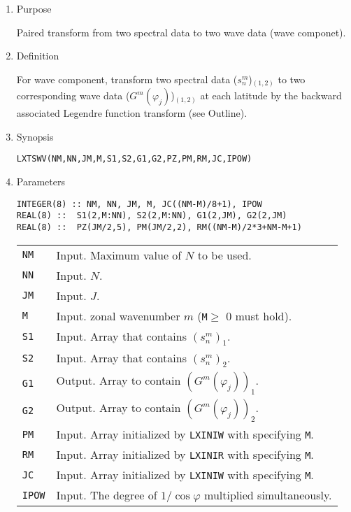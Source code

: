 \documentclass[a4paper]{scrartcl}
\begin{document}
\begin{enumerate}

\item Purpose

Paired transform from two spectral data to two wave data (wave componet).

\item Definition

For wave component, transform two spectral data ($s^m_n$)$_{(1,2)}$
to two corresponding wave data ($G^m(\varphi_j)$)$_{(1,2)}$ at each latitude
by the backward associated Legendre function transform (see Outline).

\item Synopsis 

\texttt{LXTSWV(NM,NN,JM,M,S1,S2,G1,G2,PZ,PM,RM,JC,IPOW)}
  
\item Parameters

\begin{verbatim}  
INTEGER(8) :: NM, NN, JM, M, JC((NM-M)/8+1), IPOW
REAL(8) ::  S1(2,M:NN), S2(2,M:NN), G1(2,JM), G2(2,JM)
REAL(8) ::  PZ(JM/2,5), PM(JM/2,2), RM((NM-M)/2*3+NM-M+1)
\end{verbatim}  

\begin{tabular}{ll}
\texttt{NM} & Input. Maximum value of $N$ to be used.\\
\texttt{NN} & Input. $N$.\\
\texttt{JM} & Input. $J$.\\
\texttt{M} & Input. zonal wavenumber $m$ 
(\texttt{M}$\ge$ 0 must hold).\\
\texttt{S1} & Input. Array that contains $(s^m_n)_1$.\\
\texttt{S2} & Input. Array that contains $(s^m_n)_2$.\\
\texttt{G1} & Output. Array to contain $(G^m(\varphi_j))_1$.\\
\texttt{G2} & Output. Array to contain $(G^m(\varphi_j))_2$.\\
\texttt{PM}  & Input. Array initialized by \texttt{LXINIW}
with specifying \texttt{M}.\\
\texttt{RM} & Input. Array initialized by \texttt{LXINIR}
with specifying \texttt{M}.\\
\texttt{JC} & Input. Array initialized by \texttt{LXINIW}
with specifying \texttt{M}.\\
\texttt{IPOW} & Input. 
The degree of $1/\cos\varphi$ multiplied 
simultaneously.\\
\end{tabular}


\end{enumerate}
\end{document}

